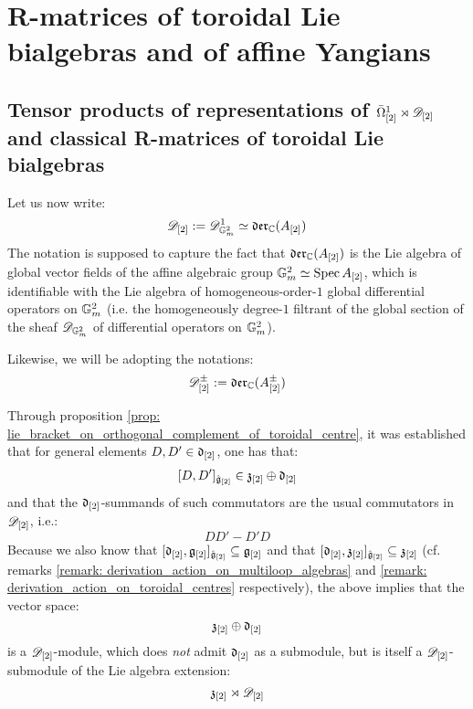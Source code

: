 \section{R-matrices of toroidal Lie bialgebras and of affine Yangians}
    \subsection{Tensor products of representations of \texorpdfstring{$\bar{\Omega}_{[2]}^1 \rtimes \mathscr{D}_{[2]}$}{} and classical R-matrices of toroidal Lie bialgebras}
        \begin{convention}
            Let us now write:
                $$\mathscr{D}_{[2]} := \mathscr{D}_{\mathbb{G}_m^2}^1 \simeq \mathfrak{der}_{\mathbb{C}}(A_{[2]})$$
            The notation is supposed to capture the fact that $\mathfrak{der}_{\mathbb{C}}(A_{[2]})$ is the Lie algebra of global vector fields of the affine algebraic group $\mathbb{G}_m^2 \simeq \operatorname{Spec} A_{[2]}$, which is identifiable with the Lie algebra of homogeneous-order-$1$ global differential operators on $\mathbb{G}_m^2$ (i.e. the homogeneously degree-$1$ filtrant of the global section of the sheaf $\mathscr{D}_{\mathbb{G}_m^2}$ of differential operators on $\mathbb{G}_m^2$).  

            Likewise, we will be adopting the notations:
                $$\mathscr{D}_{[2]}^{\pm} := \mathfrak{der}_{\mathbb{C}}(A_{[2]}^{\pm})$$
        \end{convention}
    
        Through proposition \ref{prop: lie_bracket_on_orthogonal_complement_of_toroidal_centre}, it was established that for general elements $D, D' \in \mathfrak{d}_{[2]}$, one has that:
            $$[D, D']_{\hat{\mathfrak{g}}_{[2]}} \in \mathfrak{z}_{[2]} \oplus \mathfrak{d}_{[2]}$$
        and that the $\mathfrak{d}_{[2]}$-summands of such commutators are the usual commutators in $\mathscr{D}_{[2]}$, i.e.:
            $$DD' - D'D$$
        Because we also know that $[\mathfrak{d}_{[2]}, \mathfrak{g}_{[2]}]_{\hat{\mathfrak{g}}_{[2]}} \subseteq \mathfrak{g}_{[2]}$ and that $[\mathfrak{d}_{[2]}, \mathfrak{z}_{[2]}]_{\hat{\mathfrak{g}}_{[2]}} \subseteq \mathfrak{z}_{[2]}$ (cf. remarks \ref{remark: derivation_action_on_multiloop_algebras} and \ref{remark: derivation_action_on_toroidal_centres} respectively), the above implies that the vector space:
            $$\mathfrak{z}_{[2]} \oplus \mathfrak{d}_{[2]}$$
        is a $\mathscr{D}_{[2]}$-module, which does \textit{not} admit $\mathfrak{d}_{[2]}$ as a submodule, but is itself a $\mathscr{D}_{[2]}$-submodule of the Lie algebra extension:
            $$\mathfrak{z}_{[2]} \rtimes \mathscr{D}_{[2]}$$

